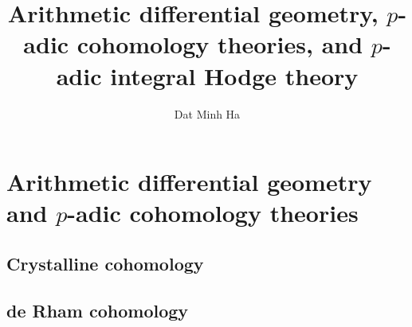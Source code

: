 

\setcounter{section}{-1}





	\title{Arithmetic differential geometry, \texorpdfstring{$p$}{}-adic cohomology theories, and \texorpdfstring{$p$}{}-adic integral Hodge theory}
	
	\author{Dat Minh Ha}
	\maketitle
	
	\begin{abstract}
	    
	\end{abstract}
	
	{
      \hypersetup{} 
      \dominitoc
      \tableofcontents %
    }
    
    \part{Arithmetic differential geometry and \texorpdfstring{$p$}{}-adic cohomology theories}
        \chapter{Crystalline cohomology}
            \begin{abstract}
                
            \end{abstract}
            
            \minitoc
            
            
            
            
            
        \begin{appendices}
            \chapter{de Rham cohomology}
                \begin{abstract}
                    
                \end{abstract}
                
                \minitoc
                
                
                
                
        \end{appendices}
            
